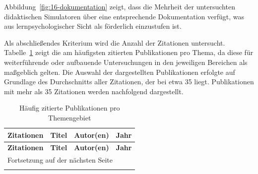 Abbildung~\ref{fig:16-dokumentation} zeigt, dass die Mehrheit der untersuchten didaktischen Simulatoren über eine entsprechende Dokumentation verfügt, was aus lernpsychologischer Sicht als förderlich einzustufen ist.

Als abschließendes Kriterium wird die Anzahl der Zitationen untersucht. Tabelle~\ref{tab:zitationen} zeigt die am häufigsten zitierten Publikationen pro Thema, da diese für weiterführende oder aufbauende Untersuchungen in den jeweiligen Bereichen als maßgeblich gelten. Die Auswahl der dargestellten Publikationen erfolgte auf Grundlage des Durchschnitts aller Zitationen, der bei etwa 35 liegt. Publikationen mit mehr als 35 Zitationen werden nachfolgend dargestellt.

{
\tiny
\centering
\begin{longtable}{|c|p{6cm}|p{3cm}|c|}
    \caption{Häufig zitierte Publikationen pro Themengebiet\label{tab:zitationen}} \\
    \hline
    \textbf{Zitationen} & \textbf{Titel} & \textbf{Autor(en)} & \textbf{Jahr} \\
    \hline
    \endfirsthead

    \hline
    \textbf{Zitationen} & \textbf{Titel} & \textbf{Autor(en)} & \textbf{Jahr} \\
    \hline
    \endhead

    \hline
    \multicolumn{4}{l}{Fortsetzung auf der nächsten Seite} \\
    \hline
    \endfoot

    \hline
    \endlastfoot


\end{longtable}}
